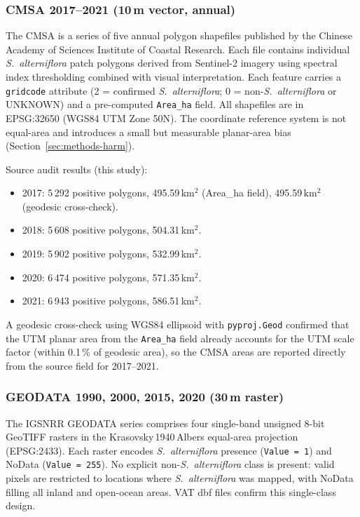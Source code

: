 \documentclass[11pt]{article}
\begin{document}
\subsubsection{CMSA 2017--2021 (10\,m vector, annual)}

The CMSA is a series of five annual polygon shapefiles published by the Chinese
Academy of Sciences Institute of Coastal Research. Each file contains individual
\textit{S.~alterniflora} patch polygons derived from Sentinel-2 imagery using
spectral index thresholding combined with visual interpretation. Each feature
carries a \texttt{gridcode} attribute (2 = confirmed \textit{S.~alterniflora};
0 = non-\textit{S.~alterniflora} or UNKNOWN) and a pre-computed \texttt{Area\_ha}
field. All shapefiles are in EPSG:32650 (WGS84 UTM Zone 50N). The coordinate
reference system is not equal-area and introduces a small but measurable
planar-area bias (Section~\ref{sec:methods-harm}).

Source audit results (this study):
\begin{itemize}[nosep]
\item 2017: 5\,292 positive polygons, 495.59\,km$^2$ (Area\_ha field), 495.59\,km$^2$ (geodesic cross-check).
\item 2018: 5\,608 positive polygons, 504.31\,km$^2$.
\item 2019: 5\,902 positive polygons, 532.99\,km$^2$.
\item 2020: 6\,474 positive polygons, 571.35\,km$^2$.
\item 2021: 6\,943 positive polygons, 586.51\,km$^2$.
\end{itemize}
A geodesic cross-check using WGS84 ellipsoid with \texttt{pyproj.Geod} confirmed
that the UTM planar area from the \texttt{Area\_ha} field already accounts for
the UTM scale factor (within 0.1\,\% of geodesic area), so the CMSA areas are
reported directly from the source field for 2017--2021.

\subsubsection{GEODATA 1990, 2000, 2015, 2020 (30\,m raster)}

The IGSNRR GEODATA series comprises four single-band unsigned 8-bit GeoTIFF
rasters in the Krasovsky\,1940\,Albers equal-area projection (EPSG:2433).
Each raster encodes \textit{S.~alterniflora} presence (\texttt{Value = 1})
and NoData (\texttt{Value = 255}). No explicit non-\textit{S.~alterniflora}
class is present: valid pixels are restricted to locations where
\textit{S.~alterniflora} was mapped, with NoData filling all inland and open-ocean
areas. VAT dbf files confirm this single-class design.
\end{document}
